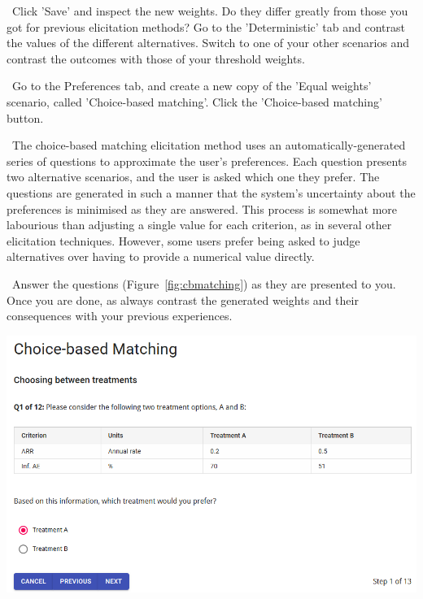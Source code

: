 \documentclass[00_mcda_tutorial.tex]{subfiles}
\begin{document}
\begin{sidebar*}
\noindent \leftpointright \, Click 'Save' and inspect the new weights. Do they differ greatly from those you got for previous elicitation methods? Go to the 'Deterministic' tab and contrast the values of the different alternatives. Switch to one of your other scenarios and contrast the outcomes with those of your threshold weights.
\newline

\noindent \leftpointright \, Go to the Preferences tab, and create a new copy of the 'Equal weights' scenario, called 'Choice-based matching'. Click the 'Choice-based matching' button.
\newline

\noindent \faGraduationCap \, The choice-based matching elicitation method uses an automatically-generated series of questions to approximate the user's preferences. Each question presents two alternative scenarios, and the user is asked which one they prefer. The questions are generated in such a manner that the system's uncertainty about the preferences is minimised as they are answered. This process is somewhat more labourious than adjusting a single value for each criterion, as in several other elicitation techniques. However, some users prefer being asked to judge alternatives over having to provide a numerical value directly.
\newline

\noindent \leftpointright \, Answer the questions (Figure~\ref{fig:cbmatching}) as they are presented to you. Once you are done, as always contrast the generated weights and their consequences with your previous experiences.
\newline

{	
	\centering
  	\includegraphics[width=\textwidth]{fig/cbmatching.png}
  	\label{fig:cbmatching}
	\par
}

\end{sidebar*}
\end{document}
